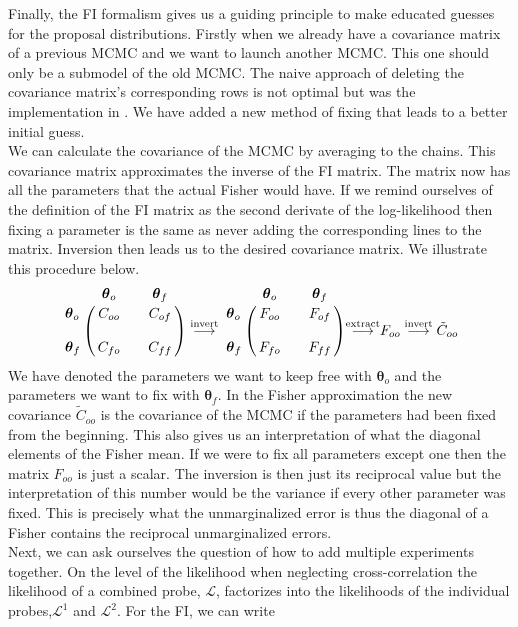 \documentclass[../main.tex]{subfiles}
\begin{document}
Finally, the FI formalism gives us a guiding principle to make educated guesses for the proposal distributions. Firstly when we already have a covariance matrix of a previous MCMC and we want to launch another MCMC. This one should only be a submodel of the old MCMC. The naive approach of deleting the covariance matrix's corresponding rows is not optimal but was the implementation in \montepython. We have added a new method of fixing that leads to a better initial guess.\\
We can calculate the covariance of the MCMC by averaging to the chains. This covariance matrix approximates the inverse of the FI matrix. The matrix now has all the parameters that the actual Fisher would have. If we remind ourselves of the definition of the FI matrix as the second derivate of the log-likelihood then fixing a parameter is the same as never adding the corresponding lines to the matrix. Inversion then leads us to the desired covariance matrix. We illustrate this procedure below.
\begin{equation}
    \bordermatrix{~ & \boldsymbol{\theta}_o && \boldsymbol{\theta}_f \cr
    \boldsymbol{\theta}_o &C_{oo}&& C_{of}\cr
    \cr
    \boldsymbol{\theta}_f &C_{fo}&& C_{ff}\cr } \overset{\mathrm{invert}}{\longrightarrow}     
    \bordermatrix{~ & \boldsymbol{\theta}_o && \boldsymbol{\theta}_f \cr
    \boldsymbol{\theta}_o &F_{oo}&& F_{of}\cr
    \cr
    \boldsymbol{\theta}_f &F_{fo}&& F_{ff}\cr } {\overset{\mathrm{extract}}{\longrightarrow}} F_{oo} \overset{\mathrm{invert}}{\longrightarrow} \tilde{C}_{oo} \nonumber
\end{equation}
We have denoted the parameters we want to keep free with $\boldsymbol{\theta}_o$ and the parameters we want to fix with $\boldsymbol{\theta}_f$. In the Fisher approximation the new covariance $\tilde{C}_{oo}$ is the covariance of the MCMC if the parameters had been fixed from the beginning. This also gives us an interpretation of what the diagonal elements of the Fisher mean. If we were to fix all parameters except one then the matrix $F_{oo}$ is just a scalar. The inversion is then just its reciprocal value but the interpretation of this number would be the variance if every other parameter was fixed. This is precisely what the unmarginalized error is thus the diagonal of a Fisher contains the reciprocal unmarginalized errors.\\
Next, we can ask ourselves the question of how to add multiple experiments together. On the level of the likelihood when neglecting cross-correlation the likelihood of a combined probe, $\mathcal{L}$, factorizes into the likelihoods of the individual probes,$\mathcal{L}^1$ and $\mathcal{L}^2$. For the FI, we can write 
\end{document}

